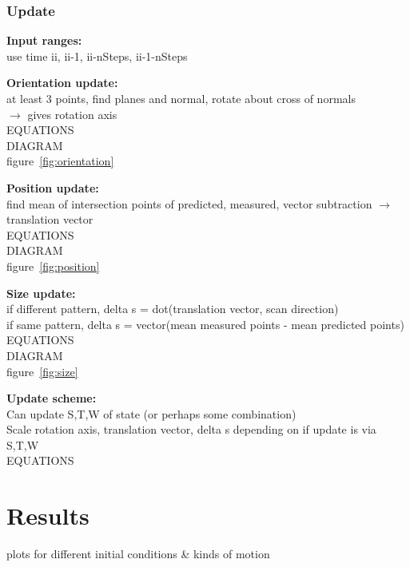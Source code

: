 	\subsubsection{Update}
		\textbf{Input ranges:}\\
		use time ii, ii-1, ii-nSteps, ii-1-nSteps
	
		\textbf{Orientation update:}\\
			at least 3 points, find planes and normal, rotate about cross of normals\\
			$\rightarrow$ gives rotation axis\\
			EQUATIONS\\
			DIAGRAM\\
			figure~\ref{fig:orientation}
			
			
		\textbf{Position update:}\\
			find mean of intersection points of predicted, measured, vector subtraction
			$\rightarrow$ translation vector\\
			EQUATIONS\\
			DIAGRAM\\
			figure~\ref{fig:position}
			
			
		\textbf{Size update:}\\
			if different pattern, delta s = dot(translation vector, scan direction)\\
			if same pattern, delta s = vector(mean measured points - mean predicted points)\\
			EQUATIONS\\
			DIAGRAM\\
			figure~\ref{fig:size}
			
			
		\textbf{Update scheme:}\\
			Can update S,T,W of state (or perhaps some combination)\\
			Scale rotation axis, translation vector, delta s depending on if update is via S,T,W\\
			EQUATIONS\\
			
			
\section{Results}
plots for different initial conditions \& kinds of motion
	
